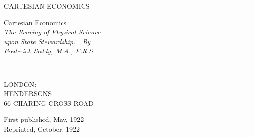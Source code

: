\documentclass[10.5pt,twoside]{book}
\begin{document}
\frontmatter
\pagestyle{empty}

\vspace*{2.1in}
\begin{center}
  {\large CARTESIAN ECONOMICS}
\end{center}
\clearpage\null\clearpage

\vspace*{1.45in}
\begin{center}
  {\fontsize{21}{25}\selectfont Cartesian Economics}\\[26pt]
  {\fontsize{12.5}{17}\selectfont\itshape The Bearing of Physical Science\\
   upon State Stewardship.\ \ By\\[3pt]
   Frederick Soddy, M.A., F.R.S.}\\[16pt]
  \rule{1.5in}{0.5pt}\\[2.30in]
  {\footnotesize LONDON:}\\[7pt]
  {\fontsize{15}{18}\selectfont HENDERSONS}\\[5pt]
  {\footnotesize 66 CHARING CROSS ROAD}\\[12pt]
\end{center}
\clearpage

\null\vfill
\begin{center}
  {\footnotesize First published, May, 1922}\\[4pt]
  {\footnotesize Reprinted, October, 1922}
\end{center}
\vspace*{1.4in}
\clearpage

\mainmatter
\pagestyle{fancy}
\setcounter{page}{3}
\thispagestyle{plain}
\end{document}
